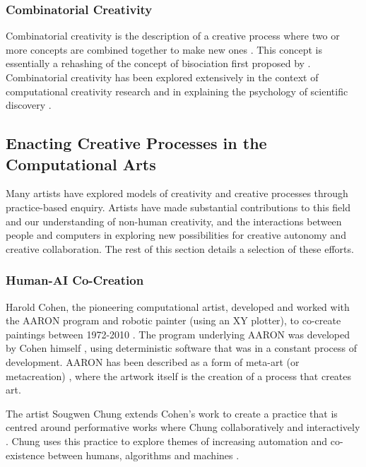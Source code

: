 \subsubsection{Combinatorial Creativity}

Combinatorial creativity is the description of a creative process where two or more concepts are combined together to make new ones \citep{boden2004creative}. 
This concept is essentially a rehashing of the concept of bisociation first proposed by \cite{koestler1964act}. 
Combinatorial creativity has been explored extensively in the context of computational creativity research \citep{zarraonandia2017using, guzdial2018combinets, guzdial2018combinatorial} and in explaining the psychology of scientific discovery \citep{simonton2021scientific, simonton2022serendipity}.

\subsection{Enacting Creative Processes in the Computational Arts}

Many artists have explored models of creativity and creative processes through practice-based enquiry.
Artists have made substantial contributions to this field and our understanding of non-human creativity, and the interactions between people and computers in exploring new possibilities for creative autonomy and creative collaboration.
The rest of this section details a selection of these efforts.

\subsubsection{Human-AI Co-Creation}

Harold Cohen, the pioneering computational artist, developed and worked with the AARON program and robotic painter (using an XY plotter), to co-create paintings between 1972-2010 \citep{cohen2016harold}. 
The program underlying AARON was developed by Cohen himself \citep{cohen1995further}, using deterministic software that was in a constant process of development. 
AARON has been described as a form of meta-art (or metacreation) \citep{mccorduck1991aaron}, where the artwork itself is the creation of a process that creates art.

The artist Sougwen Chung extends Cohen's work to create a practice that is centred around performative works where Chung collaboratively and interactively \citep{benediktsson2019human}.
Chung uses this practice to explore themes of increasing automation and co-existence between humans, algorithms and machines \citep{voss2021conversation}.

